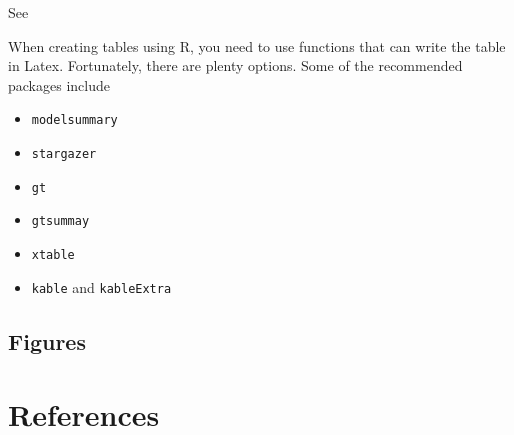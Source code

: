 \documentclass[
  letterpaper,
  DIV=11,
  numbers=noendperiod]{scrreprt}
\providecommand{\tightlist}{%
  \setlength{\itemsep}{0pt}\setlength{\parskip}{0pt}}\usepackage{longtable,booktabs,array}
\newlength{\cslhangindent}
\newlength{\cslentryspacingunit} %
\newenvironment{CSLReferences}[2] %
 {%
  \setlength{\parindent}{0pt}
  \ifodd #1
  \let\oldpar\par
  \def\par{\hangindent=\cslhangindent\oldpar}
  \fi
  \setlength{\parskip}{#2\cslentryspacingunit}
 }%
 {}
\begin{document}
See

When creating tables using R, you need to use functions that can write
the table in Latex. Fortunately, there are plenty options. Some of the
recommended packages include

\begin{itemize}
\tightlist
\item
  \texttt{modelsummary}
\item
  \texttt{stargazer}
\item
  \texttt{gt}
\item
  \texttt{gtsummay}
\item
  \texttt{xtable}
\item
  \texttt{kable} and \texttt{kableExtra}
\end{itemize}

\hypertarget{figures-2}{%
\section{Figures}\label{figures-2}}


\hypertarget{references}{%
\chapter*{References}\label{references}}


\hypertarget{refs}{}
\begin{CSLReferences}{0}{0}
\end{CSLReferences}
\end{document}
